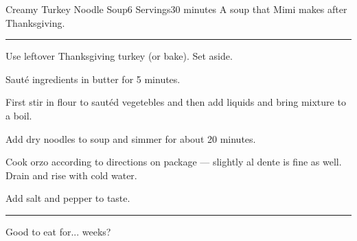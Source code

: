 \documentclass[openany]{book}
\begin{document}
\begin{recipe}{Creamy Turkey Noodle Soup}{6 Servings}{30 minutes} %
\freeform A soup that Mimi makes after Thanksgiving.       %
\freeform\rule{\textwidth}{0.05pt}                         %


Use leftover Thanksgiving turkey (or bake). Set aside.


Saut\'{e} ingredients in butter for 5 minutes.


First stir in flour to saut\'{e}d vegetebles and then add liquids and bring mixture to a boil.


Add dry noodles to soup and simmer for about 20 minutes.

Cook orzo according to directions on package --- slightly al dente is fine as well. Drain and rise with cold water.


Add salt and pepper to taste.

\freeform\rule{\textwidth}{0.05pt} 

\freeform Good to eat for... weeks?

\end{recipe}
\end{document}
